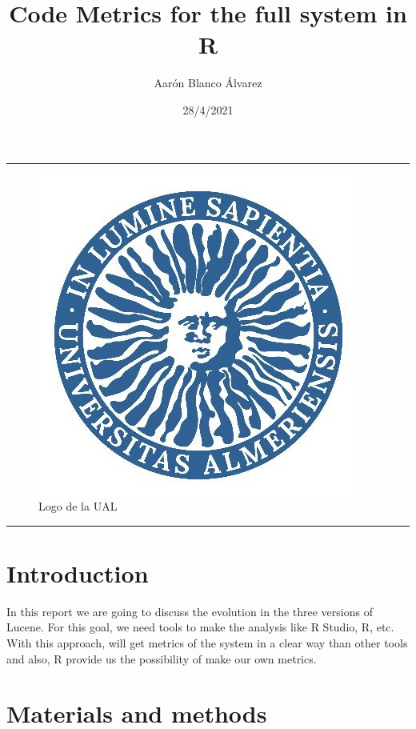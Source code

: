 \documentclass[
]{article}
\title{Code Metrics for the full system in R}
\author{Aarón Blanco Álvarez}
\date{28/4/2021}
\begin{document}
\maketitle

\begin{center}\rule{0.5\linewidth}{0.5pt}\end{center}

\begin{figure}
\centering
\includegraphics{ual.jpg}
\caption{Logo de la UAL}
\end{figure}

\begin{center}\rule{0.5\linewidth}{0.5pt}\end{center}

\hypertarget{introduction}{%
\section{Introduction}\label{introduction}}

In this report we are going to discuss the evolution in the three
versions of Lucene. For this goal, we need tools to make the analysis
like R Studio, R, etc. With this approach, will get metrics of the
system in a clear way than other tools and also, R provide us the
possibility of make our own metrics.

\hypertarget{materials-and-methods}{%
\section{Materials and methods}\label{materials-and-methods}}
\end{document}
